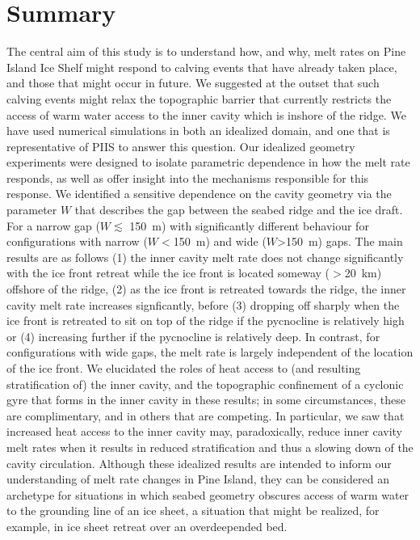 \documentclass[draft]{agujournal2019}
\begin{document}
\section{Summary}\label{S:Summary}
The central aim of this study is to understand how, and why, melt rates on Pine Island Ice Shelf might respond to calving events that have already taken place, and those that might occur in future. We suggested at the outset that such calving events might relax the topographic barrier that currently restricts the access of warm water access to the inner cavity which is inshore of the ridge. We have used numerical simulations in both an idealized domain, and one that is representative of PIIS to answer this question.
Our idealized geometry experiments were designed to isolate parametric dependence in how the melt rate responds, as well as offer insight into the mechanisms responsible for this response. We identified a sensitive dependence on the cavity geometry via the parameter $W$ that describes the gap between the seabed ridge and the ice draft. For a narrow gap ($W \lesssim$ 150~m) with significantly different behaviour for configurations with narrow ($W<$150~m) and wide ($W$>150~m) gaps. The main results are as follows (1) the inner cavity melt rate does not change significantly with the ice front retreat while the ice front is located someway ($>$20~km) offshore of the ridge, (2) as the ice front is retreated towards the ridge, the inner cavity melt rate increases signficantly, before (3) dropping off sharply when the ice front is retreated to sit on top of the ridge if the pycnocline is relatively high or (4) increasing further if the pycnocline is relatively deep. In contrast, for configurations with wide gaps, the melt rate is largely independent of the location of the ice front. We elucidated the roles of heat access to (and resulting stratification of) the inner cavity, and the topographic confinement of a cyclonic gyre that forms in the inner cavity in these results; in some circumstances, these are complimentary, and in others that are competing. In particular, we saw that increased heat access to the inner cavity may, paradoxically, reduce inner cavity melt rates when it results in reduced stratification and thus a slowing down of the cavity circulation. Although these idealized results are intended to inform our understanding of melt rate changes in Pine Island, they can be considered an archetype for situations in which seabed geometry obscures access of warm water to the grounding line of an ice sheet, a situation that might be realized, for example, in ice sheet retreat over an overdeepended bed. 
\end{document}
